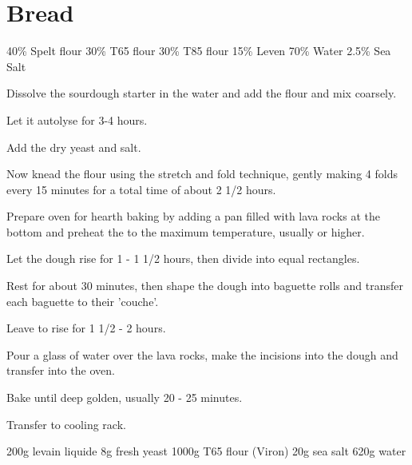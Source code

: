 \chapter{Bread}
\minitoc

\label{rec:spelt-loaf}

\begin{ingreds}
	40\% Spelt flour
	30\% T65 flour
	30\% T85 flour
	15\% Leven
	70\% Water
	2.5\% Sea Salt

\end{ingreds}

\begin{method}		
     	Dissolve the sourdough starter in the water and add the flour and mix coarsely.

	Let it autolyse for 3-4 hours.

	Add the dry yeast and salt.

	Now knead the flour using the stretch and fold technique, gently making 4 folds  every 15 minutes for a total time of about 2 1/2 hours.

	Prepare oven for hearth baking by adding a pan filled with lava rocks at the bottom and preheat the to the maximum temperature, usually  or higher.

	Let the dough rise for 1 - 1 1/2 hours, then divide into equal rectangles.

	Rest for about 30 minutes, then shape the dough into baguette rolls and transfer each baguette to their 'couche'.

	Leave to rise for 1 1/2 - 2 hours.

	Pour a glass of water over the lava rocks, make the incisions into the dough and transfer into the oven.

	Bake until deep golden,  usually 20 - 25 minutes.

	Transfer to cooling rack.

\end {method}

\label{rec:bread-baguette}

\begin{ingreds}
	200g levain liquide
	8g fresh yeast
	1000g T65 flour (Viron)
	20g sea salt
	620g water

\end{ingreds}

